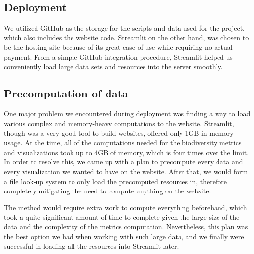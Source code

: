 \documentclass{article}
\begin{document}
\subsection{Deployment}
We utilized GitHub as the storage for the scripts and data used for the project, which also includes the website code. Streamlit on the other hand, was chosen to be the hosting site because of its great ease of use while requiring no actual payment. From a simple GitHub integration procedure, Streamlit helped us conveniently load large data sets and resources into the server smoothly.
\subsection{Precomputation of data}
One major problem we encountered during deployment was finding a way to load various complex and memory-heavy computations to the website. Streamlit, though was a very good tool to build websites, offered only 1GB in memory usage. At the time, all of the computations needed for the biodiversity metrics and visualizations took up to 4GB of memory, which is four times over the limit. In order to resolve this, we came up with a plan to precompute every data and every visualization we wanted to have on the website. After that, we would form a file look-up system to only load the precomputed resources in, therefore completely mitigating the need to compute anything on the website.
\par
The method would require extra work to compute everything beforehand, which took a quite significant amount of time to complete given the large size of the data and the complexity of the metrics computation. Nevertheless, this plan was the best option we had when working with such large data, and we finally were successful in loading all the resources into Streamlit later.
\end{document}

